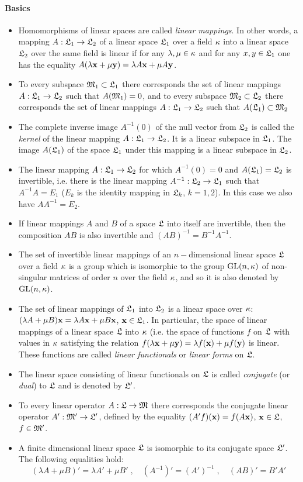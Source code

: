 \paragraph{Basics}
\begin{itemize}
	\item Homomorphisms of linear spaces are called \emph{linear mappings}. In other words, a mapping $A:\mathfrak{L}_1\to \mathfrak{L}_2$ of a linear space $\mathfrak{L}_1$ over a field $\kappa$ into a linear space $\mathfrak{L}_2$ over the same field is linear if for any $\lambda,\mu\in\kappa$ and for any $x,y\in\mathfrak{L}_1$ one has the equality $A(\lambda \mathbf{x}+\mu \mathbf{y})=\lambda A\mathbf{x}+\mu A\mathbf{y}$.
	\item To every subspace $\mathfrak{M}_1\subset\mathfrak{L}_1$ there corresponds the set of linear mappings $A:\mathfrak{L}_1\to \mathfrak{L}_2$ such that $A(\mathfrak{M}_1) = 0$, and to every subspace $\mathfrak{M}_2\subset\mathfrak{L}_2$ there corresponds the set of linear mappings $A:\mathfrak{L}_1\to \mathfrak{L}_2$ such that $A(\mathfrak{L}_1)\subset\mathfrak{M}_2$ 
	\item The complete inverse image $A^{-1}(0)$ of the null vector from $\mathfrak{L}_2$ is called the \emph{kernel} of the linear mapping $A:\mathfrak{L}_1\to \mathfrak{L}_2$. It is a linear subspace in $\mathfrak{L}_1$. The image $A(\mathfrak{L}_1)$ of the space $\mathfrak{L}_1$ under this mapping is a linear subspace in $\mathfrak{L}_2$.
	\item The linear mapping $A: \mathfrak{L}_1\to\mathfrak{L}_2$ for which $A^{-1}(0) = 0$ and $A(\mathfrak{L}_1) = \mathfrak{L}_2$ is invertible, i.e. there is the linear mapping $A^{-1}: \mathfrak{L}_2\to\mathfrak{L}_1$ such that
	$A^{-1}A = E_1$ ($E_k$ is the identity mapping in $\mathfrak{L}_k$, $k = 1,2$). In this case we also have $AA^{-1}= E_2$.
	\item If linear mappings $A$ and $B$ of a space $\mathfrak{L}$ into itself are invertible, then
	the composition $AB$ is also invertible and $(AB)^{-1} = B^{-1}A^{-1}$.
	\item The set of invertible linear mappings of an $n-$dimensional linear space $\mathfrak{L}$ over a field $\kappa$ is a group which is isomorphic to the group $\mathrm{GL}(n, \kappa)$ of non-singular matrices of order $n$ over the field $\kappa$, and so it is also denoted by $\mathrm{GL}(n, \kappa)$.
	\item The set of linear mappings of $\mathfrak{L}_1$ into $\mathfrak{L}_2$ is a linear space over $\kappa$: $(\lambda A+\mu B)\mathbf{x}=\lambda A\mathbf{x}+\mu B\mathbf{x}$, $\mathbf{x}\in\mathfrak{L}_1$. In particular, the space of linear mappings of a linear space $\mathfrak{L}$ into $\kappa$
	(i.e. the space of functions $f$ on $\mathfrak{L}$ with values in $\kappa$ satisfying the relation
	$f(\lambda \mathbf{x}+\mu\mathbf{y}) = \lambda f(\mathbf{x})+\mu f(\mathbf{y})$ is linear. These functions are called \emph{linear functionals} or \emph{linear forms} on $\mathfrak{L}$.
	\item The linear space consisting of linear functionals on $\mathfrak{L}$ is called \emph{conjugate} (or \emph{dual}) to $\mathfrak{L}$ and is denoted by $\mathfrak{L}'$.
	\item To every linear operator $A:\mathfrak{L}\to\mathfrak{M}$ there corresponds the conjugate linear operator $A':\mathfrak{M}'\to\mathfrak{L}'$, defined by the equality $(A'f)(\mathbf{x})=f(A\mathbf{x})$, $\mathbf{x}\in\mathfrak{L}$, $f\in\mathfrak{M}'$.
	\item A finite dimensional linear space $\mathfrak{L}$ is isomorphic to its conjugate space $\mathfrak{L}'$. The following equalities hold: 
	$$(\lambda A+\mu B)'=\lambda A'+\mu B'\;,\quad (A^{-1})'=(A')^{-1}\;,\quad (AB)'=B'A'$$
\end{itemize}

